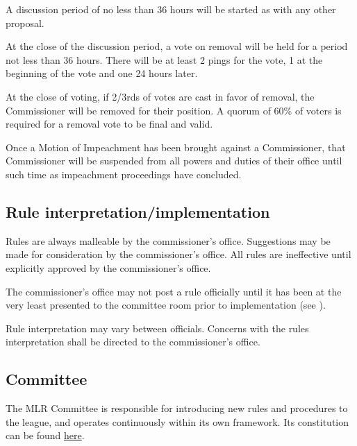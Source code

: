 \begin{deepEnumerate}
\begin{deepEnumerate}
\begin{deepEnumerate}
			A discussion period of no less than 36 hours will be started 
			as with any other proposal.
			\item At the close of the discussion period, 
			a vote on removal will be held for a period not less than 36 hours. 
			There will be at least 2 pings for the vote, 
			1 at the beginning of the vote and one 24 hours later.
			\item At the close of voting,
			if 2/3rds of votes are cast in favor of removal, 
			the Commissioner will be removed for their position. 
			A quorum of 60\% of voters is required 
			for a removal vote to be final and valid.
		\end{deepEnumerate}
		\item Once a Motion of Impeachment has been brought against a Commissioner, 
		that Commissioner will be suspended from all powers and duties of their office 
		until such time as impeachment proceedings have concluded.
	\end{deepEnumerate}
\end{deepEnumerate}

\subsection{Rule interpretation/implementation}
\begin{deepEnumerate}
	\item Rules are always malleable by the commissioner's office.
	Suggestions may be made for consideration by the commissioner's office.
	All rules are ineffective until explicitly approved by the commissioner's office.
	\item The commissioner's office may not post a rule officially 
	until it has been at the very least presented to the committee room 
	prior to implementation (see ).
	\item Rule interpretation may vary between officials.
	Concerns with the rules interpretation shall be directed to the commissioner's office.
\end{deepEnumerate}

\subsection{Committee}
\label{sec:Committee}
\begin{deepEnumerate}
	\item The MLR Committee is responsible for introducing new rules and procedures to the league,
	and operates continuously within its own framework.
	Its constitution can be found \href{https://docs.google.com/document/d/1_bd2r2KycOuCXXBswZ_7yTmSPYdP5W_ju41N0fB13nM/edit}{here}.
\end{deepEnumerate}

